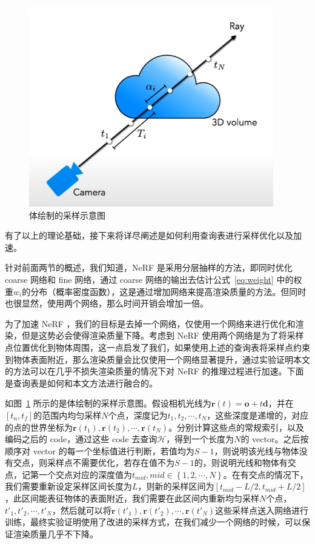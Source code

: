 \begin{figure}[t]
    \centering
    \includegraphics[width=0.95\textwidth]{figures/cloud.jpg}
    \caption{体绘制的采样示意图}
    \label{fig:cloud}
\end{figure}

有了以上的理论基础，接下来将详尽阐述是如何利用查询表进行采样优化以及加速。

针对前面两节的概述，我们知道，NeRF 是采用分层抽样的方法，即同时优化 coarse 网络和 fine 网络，通过 coarse 网络的输出去估计公式~\ref{eq:weight} 中的权重$\displaystyle w_i$的分布（概率密度函数），这是通过增加网络来提高渲染质量的方法。但同时也很显然，使用两个网络，那么时间开销会增加一倍。

为了加速 NeRF ，我们的目标是去掉一个网络，仅使用一个网络来进行优化和渲染，但是这势必会使得渲染质量下降。考虑到 NeRF 使用两个网络是为了将采样点位置优化到物体周围，这一点启发了我们，如果使用上述的查询表将采样点约束到物体表面附近，那么渲染质量会比仅使用一个网络显著提升，通过实验证明本文的方法可以在几乎不损失渲染质量的情况下对 NeRF 的推理过程进行加速。下面是查询表是如何和本文方法进行融合的。

如图~\ref{fig:cloud} 所示的是体绘制的采样示意图。假设相机光线为$\symbf{r}\left(t\right) = \symbf{o} + t \symbf{d}$，并在$\left[t_n, t_f\right]$的范围内均匀采样$N$个点，深度记为$t_{1}, t_{2}, \cdots, t_{N}$，这些深度是递增的，对应的点的世界坐标为$\symbf{r}\left(t_{1}\right), \symbf{r}\left(t_{2}\right), \cdots, \symbf{r}\left(t_{N}\right)$。分别计算这些点的常规索引，以及编码之后的 code，通过这些 code 去查询$\mathcal{H}$，得到一个长度为$N$的 vector。之后按顺序对 vector 的每一个坐标值进行判断，若值均为$S - 1$，则说明该光线与物体没有交点，则采样点不需要优化，若存在值不为$S - 1$的，则说明光线和物体有交点，记第一个交点对应的深度值为$t_{mid}, mid \in \left\{1, 2, \cdots, N\right\}$。在有交点的情况下，我们需要重新设定采样区间长度为$L$，则新的采样区间为$\left[t_{mid} - L / 2, t_{mid} + L / 2\right]$，此区间能表征物体的表面附近，我们需要在此区间内重新均匀采样$N$个点，${t\prime}_{1}, {t\prime}_{2}, \cdots, {t\prime}_{N}$，然后就可以将$\symbf{r}\left(t\prime_{1}\right), \symbf{r}\left(t\prime_{2}\right), \cdots, \symbf{r}\left(t\prime_{N}\right)$这些采样点送入网络进行训练，最终实验证明使用了改进的采样方式，在我们减少一个网络的时候，可以保证渲染质量几乎不下降。

